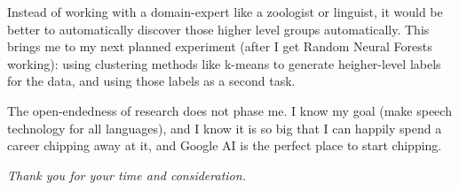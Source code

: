\documentclass[12pt,a4paper]{article}
\begin{document}
Instead of working with a domain-expert like a zoologist or linguist, it would be better to automatically discover those higher level groups automatically. This brings me to my next planned experiment (after I get Random Neural Forests working): using clustering methods like k-means to generate heigher-level labels for the data, and using those labels as a second task.



The open-endedness of research does not phase me. I know my goal (make speech technology for all languages), and I know it is so big that I can happily spend a career chipping away at it, and Google AI is the perfect place to start chipping. 



\begin{center}
\textit{Thank you for your time and consideration.}  
\end{center}
\end{document}
